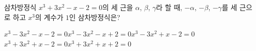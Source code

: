 삼차방정식 $x^3+3x^2-x-2=0$의 세 근을 $\alpha$, $\beta$, $\gamma$라 할 때, $-\alpha$, $-\beta$, $-\gamma$를 세 근으로 하고 $x^3$의 계수가 $1$인 삼차방정식은?
\begin{choicesii}{$x^3-3x^2-x-2=0$}{$x^3-3x^2-x+2=0$}{$x^3-3x^2+x-2=0$}{$x^3+3x^2+x-2=0$}{$x^3+3x^2+x+2=0$}\end{choicesii}
